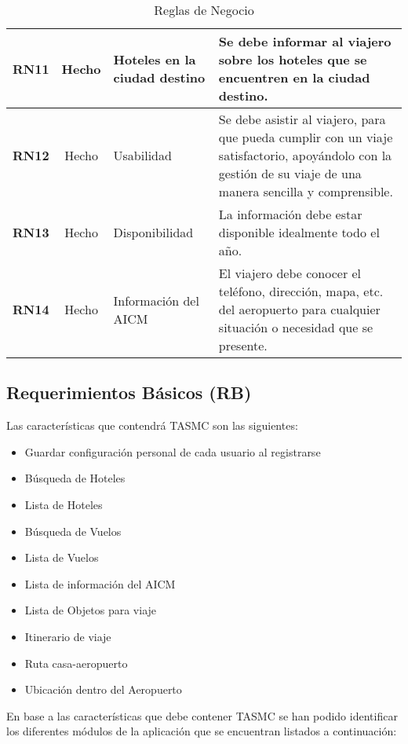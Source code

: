 \begin{table}
\begin{center}
\begin{tabular}{|c|c|p{3cm}|p{5.7cm}|}
			\hline \rowcolor[RGB]{224,224,224} 
				\textbf{RN11} &
				Hecho &
				Hoteles en la ciudad destino &
				Se debe informar al viajero sobre los hoteles que se encuentren en la ciudad destino.  \\ 
			\hline
				\textbf{RN12} &
				Hecho &
				Usabilidad &
				Se debe asistir al viajero, para que pueda cumplir con un viaje satisfactorio, apoyándolo con la gestión de su viaje de una manera sencilla y comprensible.  \\ 
			\hline \rowcolor[RGB]{224,224,224} 
				\textbf{RN13} &
				Hecho &
				Disponibilidad &
				La información debe estar disponible idealmente todo el año.  \\ 
			\hline
				\textbf{RN14} &
				Hecho &
				Información del AICM &
				El viajero debe conocer el teléfono, dirección, mapa, etc. del aeropuerto para cualquier situación o necesidad que se presente. \\ 
			\hline 
		\end{tabular}
	\end{center}
	\caption[Reglas de Negocio]{Reglas de Negocio} 
	\label{tab:reglasNegocio}
\end{table}

\subsection{Requerimientos Básicos (RB)}

Las características que contendrá TASMC son las siguientes:

\begin{itemize}
	\item Guardar configuración personal de cada usuario al registrarse
	\item Búsqueda de Hoteles
	\item Lista de Hoteles
	\item Búsqueda de Vuelos
	\item Lista de Vuelos
	\item Lista de información del AICM
	\item Lista de Objetos para viaje
	\item Itinerario de viaje
	\item Ruta casa-aeropuerto
	\item Ubicación dentro del Aeropuerto
\end{itemize}

En base a las características que debe contener TASMC se han podido identificar los diferentes módulos de la aplicación que se encuentran listados a continuación:


